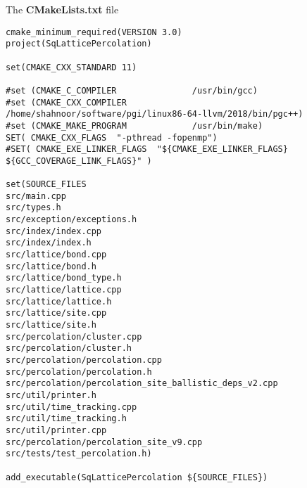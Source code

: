 
The \textbf{CMakeLists.txt} file

\begin{lstlisting}[style=CMakeStyle]
cmake_minimum_required(VERSION 3.0)
project(SqLatticePercolation)

set(CMAKE_CXX_STANDARD 11)

#set (CMAKE_C_COMPILER               /usr/bin/gcc)
#set (CMAKE_CXX_COMPILER             /home/shahnoor/software/pgi/linux86-64-llvm/2018/bin/pgc++)
#set (CMAKE_MAKE_PROGRAM             /usr/bin/make)
SET( CMAKE_CXX_FLAGS  "-pthread -fopenmp")
#SET( CMAKE_EXE_LINKER_FLAGS  "${CMAKE_EXE_LINKER_FLAGS} ${GCC_COVERAGE_LINK_FLAGS}" )

set(SOURCE_FILES
src/main.cpp
src/types.h
src/exception/exceptions.h
src/index/index.cpp
src/index/index.h
src/lattice/bond.cpp
src/lattice/bond.h
src/lattice/bond_type.h
src/lattice/lattice.cpp
src/lattice/lattice.h
src/lattice/site.cpp
src/lattice/site.h
src/percolation/cluster.cpp
src/percolation/cluster.h
src/percolation/percolation.cpp
src/percolation/percolation.h
src/percolation/percolation_site_ballistic_deps_v2.cpp
src/util/printer.h
src/util/time_tracking.cpp
src/util/time_tracking.h
src/util/printer.cpp
src/percolation/percolation_site_v9.cpp
src/tests/test_percolation.h)

add_executable(SqLatticePercolation ${SOURCE_FILES})
\end{lstlisting}